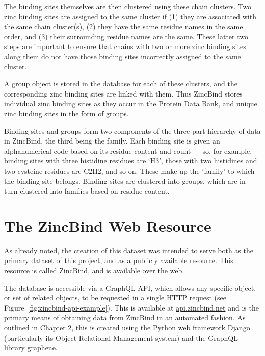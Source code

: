 The binding sites themselves are then clustered using these chain clusters. Two zinc binding sites are assigned to the same cluster if (1) they are associated with the same chain cluster(s), (2) they have the same residue names in the same order, and (3) their surrounding residue names are the same. These latter two steps are important to ensure that chains with two or more zinc binding sites along them do not have those binding sites incorrectly assigned to the same cluster.

A group object is stored in the database for each of these clusters, and the corresponding zinc binding sites are linked with them. Thus ZincBind stores individual zinc binding sites as they occur in the Protein Data Bank, and unique zinc binding sites in the form of groups.

Binding sites and groups form two components of the three-part hierarchy of data in ZincBind, the third being the family. Each binding site is given an alphanumerical code based on its residue content and count --- so, for example, binding sites with three histidine residues are `H3', those with two histidines and two cysteine residues are C2H2, and so on. These make up the `family' to which the binding site belongs. Binding sites are clustered into groups, which are in turn clustered into families based on residue content.

\section{The ZincBind Web Resource}

As already noted, the creation of this dataset was intended to serve both as the primary dataset of this project, and as a publicly available resource. This resource is called ZincBind, and is available over the web.

The database is accessible via a GraphQL API, which allows any specific object, or set of related objects, to be requested in a single HTTP request (see Figure~\ref{fig:zincbind-api-example}). This is available at \url{api.zincbind.net} and is the primary means of obtaining data from ZincBind in an automated fashion. As outlined in Chapter 2, this is created using the Python web framework Django (particularly its Object Relational Management system) and the GraphQL library graphene.

